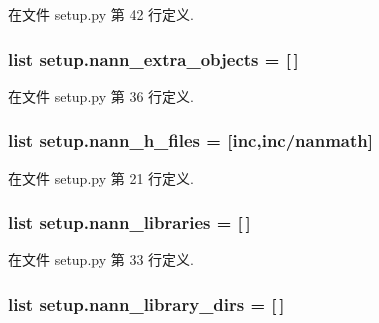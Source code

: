 在文件 setup.\+py 第 42 行定义.

\hypertarget{namespacesetup_a81583b74353eadcdbfd2817fa9302056}{}
\subsubsection[{nann\+\_\+extra\+\_\+objects}]{\setlength{\rightskip}{0pt plus 5cm}list setup.\+nann\+\_\+extra\+\_\+objects = \mbox{[}$\,$\mbox{]}}\label{namespacesetup_a81583b74353eadcdbfd2817fa9302056}


在文件 setup.\+py 第 36 行定义.

\hypertarget{namespacesetup_a25d264f9c4a7736a9768459d01558f6e}{}
\subsubsection[{nann\+\_\+h\+\_\+files}]{\setlength{\rightskip}{0pt plus 5cm}list setup.\+nann\+\_\+h\+\_\+files = \mbox{[}\textquotesingle{}inc\textquotesingle{},\textquotesingle{}inc/nanmath\textquotesingle{}\mbox{]}}\label{namespacesetup_a25d264f9c4a7736a9768459d01558f6e}


在文件 setup.\+py 第 21 行定义.

\hypertarget{namespacesetup_ae3bc32a9ba0a115dd20666d52d39eeef}{}
\subsubsection[{nann\+\_\+libraries}]{\setlength{\rightskip}{0pt plus 5cm}list setup.\+nann\+\_\+libraries = \mbox{[}$\,$\mbox{]}}\label{namespacesetup_ae3bc32a9ba0a115dd20666d52d39eeef}


在文件 setup.\+py 第 33 行定义.

\hypertarget{namespacesetup_aa5c01e7a20f0777834d3baeb4a26d4ab}{}
\subsubsection[{nann\+\_\+library\+\_\+dirs}]{\setlength{\rightskip}{0pt plus 5cm}list setup.\+nann\+\_\+library\+\_\+dirs = \mbox{[}$\,$\mbox{]}}\label{namespacesetup_aa5c01e7a20f0777834d3baeb4a26d4ab}


